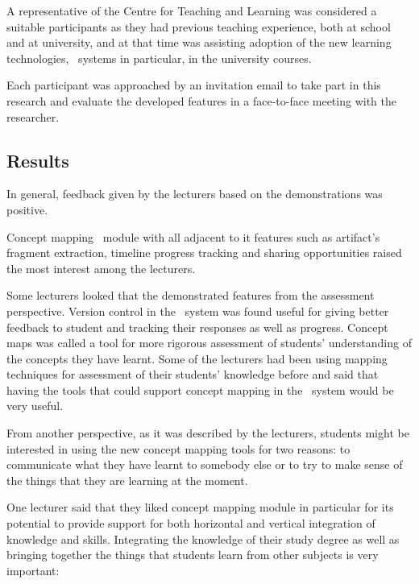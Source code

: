 A representative of the Centre for Teaching and Learning was considered a
suitable participants as they had previous teaching experience, both at school
and at university, and at that time was assisting adoption of the new learning
technologies, \ep~systems in particular, in the university courses.

Each participant was approached by an invitation email to take part in this
research and evaluate the developed features in a face-to-face meeting with the
researcher.

\subsection{Results}
\label{sec:study1results}

In general, feedback given by the lecturers based on the demonstrations was
positive.

Concept mapping \ep~module with all adjacent to it features such as
artifact's fragment extraction, timeline progress tracking and sharing
opportunities raised the most interest among the lecturers.

Some lecturers looked that the demonstrated features from the assessment
perspective. Version control in the \ep~system was found useful for giving
better feedback to student and tracking their responses as well as progress.
Concept maps was called a tool for more rigorous assessment of students'
understanding of the concepts they have learnt. Some of the lecturers had been
using mapping techniques for assessment of their students' knowledge before and
said that having the tools that could support concept mapping in the \ep~system
would be very useful.

From another perspective, as it was described by the lecturers, students might
be interested in using the new concept mapping tools for two reasons: to
communicate what they have learnt to somebody else or to try to make sense of
the things that they are learning at the moment.

One lecturer said that they liked concept mapping module in particular for its
potential to provide support for both horizontal and vertical integration of
knowledge and skills. Integrating the knowledge of their study degree as well as 
bringing together the things that students learn from other subjects is very
important:


